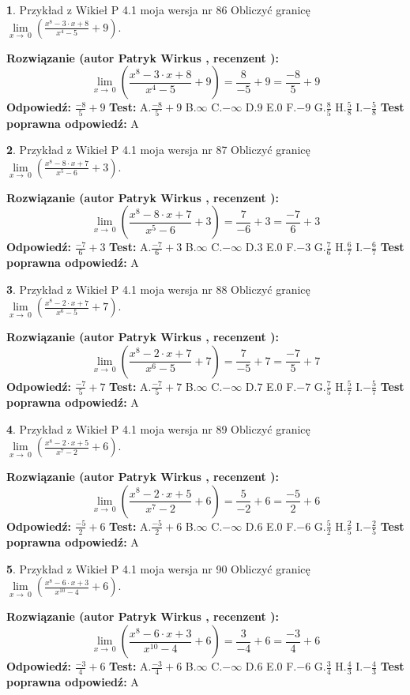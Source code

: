 \documentclass[12pt, a4paper]{article}
\theoremstyle{definition} %
\newtheorem{zad}{}
\newcommand{\zadStart}[1]{\begin{zad}#1\newline}
\newcommand{\zadStop}{\end{zad}}
\newcommand{\rozwStart}[2]{\noindent \textbf{Rozwiązanie (autor #1 , recenzent #2): }\newline}
\newcommand{\rozwStop}{\newline}
\newcommand{\odpStart}{\noindent \textbf{Odpowiedź:}\newline}
\newcommand{\odpStop}{\newline}
\newcommand{\testStart}{\noindent \textbf{Test:}\newline}
\newcommand{\testStop}{\newline}
\newcommand{\kluczStart}{\noindent \textbf{Test poprawna odpowiedź:}\newline}
\newcommand{\kluczStop}{\newline}
\begin{document}
\zadStart{Przykład z Wikieł P 4.1 moja wersja nr 86}
Obliczyć granicę $\lim\limits_{x\to\ 0}(\frac{x^{8}-3 \cdot x +8}{x^{4}-5}+9)$.
\zadStop
\rozwStart{Patryk Wirkus}{}
$$\lim\limits_{x\to\ 0}(\frac{x^{8}-3 \cdot x +8}{x^{4}-5}+9)=\frac{8}{-5}+9=\frac{-8}{5}+9$$
\rozwStop
\odpStart
$\frac{-8}{5}+9$
\odpStop
\testStart
A.$\frac{-8}{5}+9$
B.$\infty$
C.$-\infty$
D.$9$
E.$0$
F.$-9$
G.$\frac{8}{5}$
H.$\frac{5}{8}$
I.$-\frac{5}{8}$
\testStop
\kluczStart
A
\kluczStop



\zadStart{Przykład z Wikieł P 4.1 moja wersja nr 87}
Obliczyć granicę $\lim\limits_{x\to\ 0}(\frac{x^{8}-8 \cdot x +7}{x^{5}-6}+3)$.
\zadStop
\rozwStart{Patryk Wirkus}{}
$$\lim\limits_{x\to\ 0}(\frac{x^{8}-8 \cdot x +7}{x^{5}-6}+3)=\frac{7}{-6}+3=\frac{-7}{6}+3$$
\rozwStop
\odpStart
$\frac{-7}{6}+3$
\odpStop
\testStart
A.$\frac{-7}{6}+3$
B.$\infty$
C.$-\infty$
D.$3$
E.$0$
F.$-3$
G.$\frac{7}{6}$
H.$\frac{6}{7}$
I.$-\frac{6}{7}$
\testStop
\kluczStart
A
\kluczStop



\zadStart{Przykład z Wikieł P 4.1 moja wersja nr 88}
Obliczyć granicę $\lim\limits_{x\to\ 0}(\frac{x^{8}-2 \cdot x +7}{x^{6}-5}+7)$.
\zadStop
\rozwStart{Patryk Wirkus}{}
$$\lim\limits_{x\to\ 0}(\frac{x^{8}-2 \cdot x +7}{x^{6}-5}+7)=\frac{7}{-5}+7=\frac{-7}{5}+7$$
\rozwStop
\odpStart
$\frac{-7}{5}+7$
\odpStop
\testStart
A.$\frac{-7}{5}+7$
B.$\infty$
C.$-\infty$
D.$7$
E.$0$
F.$-7$
G.$\frac{7}{5}$
H.$\frac{5}{7}$
I.$-\frac{5}{7}$
\testStop
\kluczStart
A
\kluczStop



\zadStart{Przykład z Wikieł P 4.1 moja wersja nr 89}
Obliczyć granicę $\lim\limits_{x\to\ 0}(\frac{x^{8}-2 \cdot x +5}{x^{7}-2}+6)$.
\zadStop
\rozwStart{Patryk Wirkus}{}
$$\lim\limits_{x\to\ 0}(\frac{x^{8}-2 \cdot x +5}{x^{7}-2}+6)=\frac{5}{-2}+6=\frac{-5}{2}+6$$
\rozwStop
\odpStart
$\frac{-5}{2}+6$
\odpStop
\testStart
A.$\frac{-5}{2}+6$
B.$\infty$
C.$-\infty$
D.$6$
E.$0$
F.$-6$
G.$\frac{5}{2}$
H.$\frac{2}{5}$
I.$-\frac{2}{5}$
\testStop
\kluczStart
A
\kluczStop



\zadStart{Przykład z Wikieł P 4.1 moja wersja nr 90}
Obliczyć granicę $\lim\limits_{x\to\ 0}(\frac{x^{8}-6 \cdot x +3}{x^{10}-4}+6)$.
\zadStop
\rozwStart{Patryk Wirkus}{}
$$\lim\limits_{x\to\ 0}(\frac{x^{8}-6 \cdot x +3}{x^{10}-4}+6)=\frac{3}{-4}+6=\frac{-3}{4}+6$$
\rozwStop
\odpStart
$\frac{-3}{4}+6$
\odpStop
\testStart
A.$\frac{-3}{4}+6$
B.$\infty$
C.$-\infty$
D.$6$
E.$0$
F.$-6$
G.$\frac{3}{4}$
H.$\frac{4}{3}$
I.$-\frac{4}{3}$
\testStop
\kluczStart
A
\kluczStop
\end{document}

